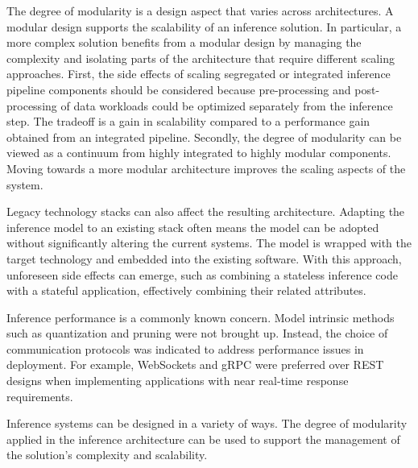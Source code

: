 The degree of modularity is a design aspect that varies across architectures. A modular design supports the scalability of an inference solution. In particular, a more complex solution benefits from a modular design by managing the complexity and isolating parts of the architecture that require different scaling approaches. First, the side effects of scaling segregated or integrated inference pipeline components should be considered because pre-processing and post-processing of data workloads could be optimized separately from the inference step. The tradeoff is a gain in scalability compared to a performance gain obtained from an integrated pipeline. Secondly, the degree of modularity can be viewed as a continuum from highly integrated to highly modular components. Moving towards a more modular architecture improves the scaling aspects of the system.

Legacy technology stacks can also affect the resulting architecture. Adapting the inference model to an existing stack often means the model can be adopted without significantly altering the current systems. The model is wrapped with the target technology and embedded into the existing software. With this approach, unforeseen side effects can emerge, such as combining a stateless inference code with a stateful application, effectively combining their related attributes.

Inference performance is a commonly known concern. Model intrinsic methods such as quantization and pruning were not brought up. Instead, the choice of communication protocols was indicated to address performance issues in deployment. For example, WebSockets and gRPC were preferred over REST designs when implementing applications with near real-time response requirements.

\begin{tcolorbox}[colback=white!73!white,colframe=gray!90!gray]
 Inference systems can be designed in a variety of ways. The degree of modularity applied in the inference architecture can be used to support the management of the solution's complexity and scalability.
\end{tcolorbox}


